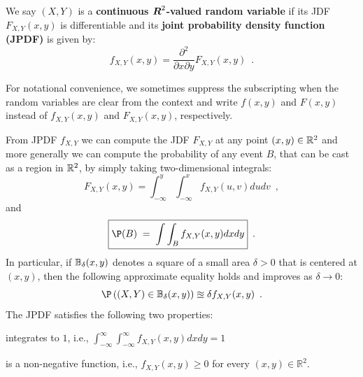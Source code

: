 \begin{definition}[JPDF] We say $(X,Y)$ is a {\bf continuous $\R^2$-valued random variable} if its JDF $F_{X,Y}(x,y)$ is differentiable and its {\bf joint probability density function (JPDF)} is given by:
\[
f_{X,Y}(x,y) = \frac{\partial^2}{\partial x \partial y} F_{X,Y}(x,y) \enspace .
\]
\end{definition}

For notational convenience, we sometimes suppress the subscripting when the random variables are clear from the context and write $f(x,y)$ and $F(x,y)$ instead of $f_{X,Y}(x,y)$ and $F_{X,Y}(x,y)$, respectively.

From JPDF $f_{X,Y}$ we can compute the JDF $F_{X,Y}$ at any point $(x,y) \in \mathbb{R}^2$ and more generally we can compute the probability of any event $B$, that can be cast as a region in $\mathbb{R}^2$, by simply taking two-dimensional integrals:
\begin{equation}\label{Eq:2ContjDFFromjPDF}
\boxed{F_{X,Y}(x,y) = \int_{-\infty}^{y} \int_{-\infty}^{x} f_{X,Y}(u,v) du dv}\enspace ,
\end{equation}
and
\begin{equation}\label{Eq:2ContProbEventFromjPDF}
\boxed{\P(B)\;=\; \int\int_{B} f_{X,Y}(x,y) dx dy}\enspace .
\end{equation}
In particular, if $\mathbb{B}_{\delta}(x,y)$ denotes a square of a small area $\delta>0$ that is centered at $(x,y)$, then the following approximate equality holds and improves as $\delta \to 0$:
\begin{equation}\label{Eq:2ContProbEventFromjPDFInSmallBall}
\P\left( (X,Y) \in \Bz_{\delta}(x,y) \right) \approxeq \delta f_{X,Y}(x,y) \enspace .
\end{equation}
The JPDF satisfies the following two properties:
\be
\item integrates to $1$, i.e., $\int_{-\infty}^{\infty} \int_{-\infty}^{\infty} f_{X,Y}(x,y) dx dy=1$
\item is a non-negative function, i.e., $f_{X,Y}(x,y) \geq 0$ for every $(x,y) \in \mathbb{R}^2$.
\ee

